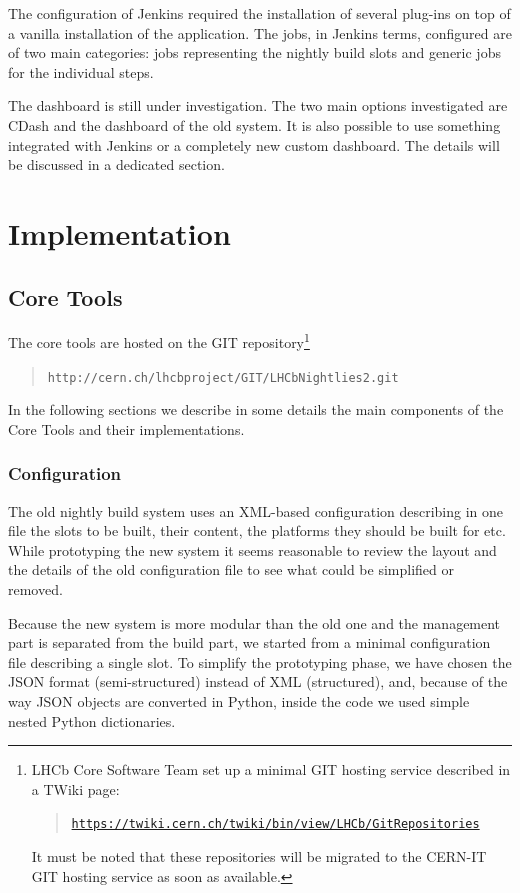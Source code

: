 \documentclass{lhcbnote}
\newcommand{\link}[2]{\href{#1}{#2}}
\newcommand{\urlLink}[1]{\link{#1}{\texttt{#1}}}
\begin{document}
The configuration of Jenkins required the installation of several plug-ins on
top of a vanilla installation of the application.  The jobs, in Jenkins terms,
configured are of two main categories: jobs representing the nightly build slots
and generic jobs for the individual steps.

The dashboard is still under investigation.  The two main options investigated
are CDash\cite{CDash} and the dashboard of the old system.  It is also possible
to use something integrated with Jenkins or a completely new custom dashboard.
The details will be discussed in a dedicated section.

\section{Implementation}
\subsection{Core Tools}
\label{CoreTools}
The core tools are hosted on the GIT repository\footnote{%
  LHCb Core Software Team set up a minimal GIT hosting service described in a
TWiki page:
  \begin{quote}
    \urlLink{https://twiki.cern.ch/twiki/bin/view/LHCb/GitRepositories}
  \end{quote}
  It must be noted that these repositories will be migrated to the CERN-IT GIT
  hosting service as soon as available.}
\begin{quote}
  \texttt{http://cern.ch/lhcbproject/GIT/LHCbNightlies2.git}
\end{quote}

In the following sections we describe in some details the main components of the
Core Tools and their implementations.

\subsubsection{Configuration}
The old nightly build system uses an XML-based configuration describing in one
file the slots to be built, their content, the platforms they should be built
for etc.  While prototyping the new system it seems reasonable to review the
layout and the details of the old configuration file to see what could be
simplified or removed.

Because the new system is more modular than the old one and the management part
is separated from the build part, we started from a minimal configuration file
describing a single slot.  To simplify the prototyping phase, we have chosen the
JSON format (semi-structured) instead of XML (structured), and, because of the
way JSON objects are converted in Python, inside the code we used simple nested
Python dictionaries.
\end{document}
